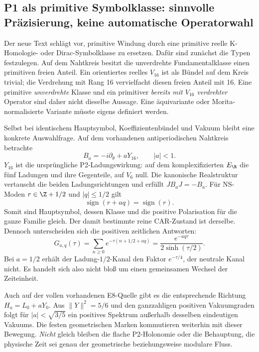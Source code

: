 \subsection{P1 als primitive Symbolklasse: sinnvolle Präzisierung, keine automatische Operatorwahl}
Der neue Text schlägt vor, primitive Windung durch eine primitive reelle K-Homologie- oder Dirac-Symbolklasse zu ersetzen. Dafür sind zunächst die Typen festzulegen. Auf dem Nahtkreis besitzt die unverdrehte Fundamentalklasse einen primitiven freien Anteil. Ein orientiertes reelles $V_{16}$ ist als Bündel auf dem Kreis trivial; die Verdrehung mit Rang 16 vervielfacht diesen freien Anteil mit 16. Eine primitive \emph{unverdrehte} Klasse und ein primitiver \emph{bereits mit $V_{16}$ verdrehter} Operator sind daher nicht dieselbe Aussage. Eine äquivariante oder Morita-normalisierte Variante müsste eigens definiert werden.

Selbst bei identischem Hauptsymbol, Koeffizientenbündel und Vakuum bleibt eine konkrete Auswahlfrage. Auf dem vorhandenen antiperiodischen Nahtkreis betrachte
\begin{equation}
B_a=-i\partial_\theta+aY_{16},\qquad |a|<1.
\end{equation}
$Y_{16}$ ist die ursprüngliche P2-Ladungswirkung: auf dem komplexifizierten $E_\R$ die fünf Ladungen und ihre Gegenteile, auf $V_6$ null. Die kanonische Realstruktur vertauscht die beiden Ladungsrichtungen und erfüllt $JB_aJ=-B_a$. Für NS-Moden $r\in\Z+1/2$ und $|q|\le1/2$ gilt
\begin{equation}
\operatorname{sign}(r+aq)=\operatorname{sign}(r).
\end{equation}
Somit sind Hauptsymbol, dessen Klasse und die positive Polarisation für die ganze Familie gleich. Der damit bestimmte reine CAR-Zustand ist derselbe. Dennoch unterscheiden sich die positiven zeitlichen Antworten:
\begin{equation}
G_{a,q}(\tau)=\sum_{n\ge0}e^{-\tau(n+1/2+aq)}
=\frac{e^{-aq\tau}}{2\sinh(\tau/2)}.
\end{equation}
Bei $a=1/2$ erhält der Ladung-$1/2$-Kanal den Faktor $e^{-\tau/4}$, der neutrale Kanal nicht. Es handelt sich also nicht bloß um einen gemeinsamen Wechsel der Zeiteinheit.

Auch auf der vollen vorhandenen E8-Quelle gibt es die entsprechende Richtung $H_a=L_0+aY_0$. Aus $\|Y\|^2=5/6$ und den ganzzahligen positiven Vakuumgraden folgt für $|a|<\sqrt{3/5}$ ein positives Spektrum außerhalb desselben eindeutigen Vakuums. Die festen geometrischen Marken kommutieren weiterhin mit dieser Bewegung. \emph{Nicht} gleich bleiben die flache P2-Holonomie oder die Behauptung, die physische Zeit sei genau der geometrische beziehungsweise modulare Fluss.

